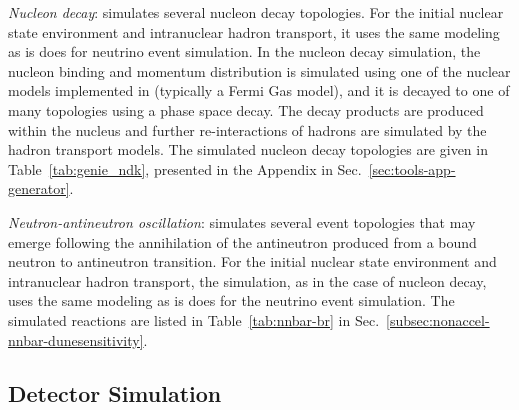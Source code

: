 \textit{Nucleon decay}:  simulates several nucleon decay topologies. For the initial nuclear state environment and intranuclear hadron transport, it uses the same modeling as is does for neutrino event simulation. In the nucleon decay simulation, the nucleon binding and momentum distribution is simulated using one of the nuclear models implemented in  (typically a Fermi Gas model), and it is decayed to one of many topologies using a phase space decay. The decay products are produced within the nucleus and further re-interactions of hadrons are simulated by the  hadron transport models. The simulated nucleon decay topologies are given in Table~\ref{tab:genie_ndk}, presented in the Appendix
in Sec.~\ref{sec:tools-app-generator}.

\textit{Neutron-antineutron oscillation}:  simulates several event topologies that may emerge following the annihilation of the antineutron produced from a bound neutron to antineutron transition. For the initial nuclear state environment and intranuclear hadron transport, the simulation, as in the case of nucleon decay, uses the same modeling as  is does for the neutrino event simulation. The simulated reactions are listed in Table~\ref{tab:nnbar-br} in 
Sec.~\ref{subsec:nonaccel-nnbar-dunesensitivity}.


\subsection{Detector Simulation}
\label{sec:tools-mc-detsim}


